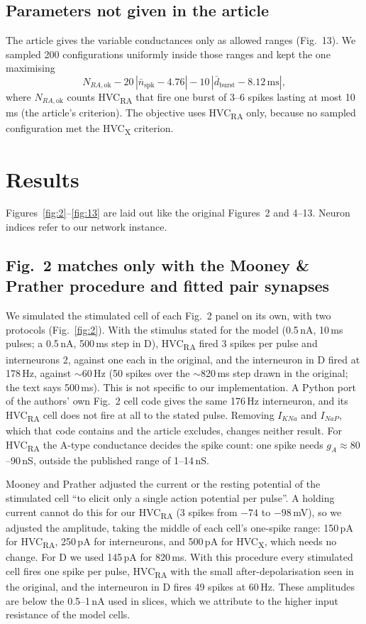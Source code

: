 \subsection*{Parameters not given in the article}
The article gives the variable conductances only as allowed ranges (Fig.~13). We sampled 200
configurations uniformly inside those ranges and kept the one maximising
\[
N_{RA,\text{ok}} - 20\,|\bar{n}_\text{spk} - 4.76| - 10\,|\bar{d}_\text{burst} - 8.12\,\text{ms}|,
\]
where $N_{RA,\text{ok}}$ counts HVC\textsubscript{RA} that fire one burst of 3--6 spikes lasting
at most 10\,ms (the article's criterion). The objective uses HVC\textsubscript{RA} only, because
no sampled configuration met the HVC\textsubscript{X} criterion.

\section*{Results}

Figures~\ref{fig:2}--\ref{fig:13} are laid out like the original Figures~2 and 4--13. Neuron
indices refer to our network instance.

\subsection*{Fig.~2 matches only with the Mooney \& Prather procedure and fitted pair synapses}
We simulated the stimulated cell of each Fig.~2 panel on its own, with two protocols
(Fig.~\ref{fig:2}). With the stimulus stated for the model (0.5\,nA, 10\,ms pulses; a 0.5\,nA,
500\,ms step in D), HVC\textsubscript{RA} fired 3 spikes per pulse and interneurons 2, against one
each in the original, and the interneuron in D fired at 178\,Hz, against $\sim$60\,Hz (50 spikes
over the $\sim$820\,ms step drawn in the original; the text says 500\,ms). This is not specific to
our implementation. A Python port of the authors' own Fig.~2 cell code gives the same 176\,Hz
interneuron, and its HVC\textsubscript{RA} cell does not fire at all to the stated pulse. Removing
$I_{KNa}$ and $I_{NaP}$, which that code contains and the article excludes, changes neither result.
For HVC\textsubscript{RA} the A-type conductance decides the spike count: one spike needs
$g_A\approx 80$--90\,nS, outside the published range of 1--14\,nS.

Mooney and Prather adjusted the current or the resting potential of the stimulated cell
``to elicit only a single action potential per pulse''\supercite{MooneyPrather2005}. A holding
current cannot do this for our HVC\textsubscript{RA} (3 spikes from $-74$ to $-98$\,mV), so we
adjusted the amplitude, taking the middle of each cell's one-spike range: 150\,pA for
HVC\textsubscript{RA}, 250\,pA for interneurons, and 500\,pA for HVC\textsubscript{X}, which needs
no change. For D we used 145\,pA for 820\,ms. With this procedure every stimulated cell fires one
spike per pulse, HVC\textsubscript{RA} with the small after-depolarisation seen in the original,
and the interneuron in D fires 49 spikes at 60\,Hz. These amplitudes are below the 0.5--1\,nA used
in slices, which we attribute to the higher input resistance of the model cells.

